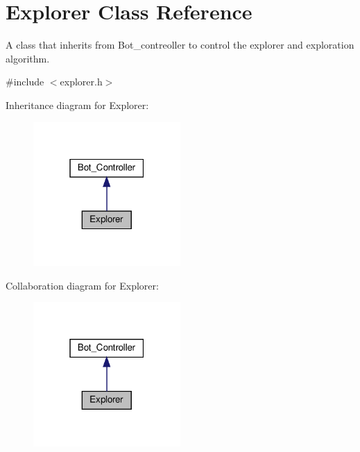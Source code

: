 \hypertarget{class_explorer}{}\section{Explorer Class Reference}
\label{class_explorer}


A class that inherits from Bot\+\_\+contreoller to control the explorer and exploration algorithm.  




{\ttfamily \#include $<$explorer.\+h$>$}



Inheritance diagram for Explorer\+:
\nopagebreak
\begin{figure}[H]
\begin{center}
\leavevmode
\includegraphics[width=159pt]{class_explorer__inherit__graph}
\end{center}
\end{figure}


Collaboration diagram for Explorer\+:
\nopagebreak
\begin{figure}[H]
\begin{center}
\leavevmode
\includegraphics[width=159pt]{class_explorer__coll__graph}
\end{center}
\end{figure}
